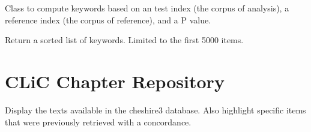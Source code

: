 \documentclass[letterpaper,10pt,english]{sphinxmanual}
\begin{document}
\begin{fulllineitems}
\label{apidoc:keywords.Keywords}
Class to compute keywords based on an test index (the corpus of analysis),
a reference index (the corpus of reference), and a P value.

\begin{fulllineitems}
\label{apidoc:keywords.Keywords.list_keywords}
Return a sorted list of keywords. Limited to the first 5000 items.

\end{fulllineitems}


\end{fulllineitems}



\section{CLiC Chapter Repository}
\label{apidoc:clic-chapter-repository}\label{apidoc:module-chapter_repository}
Display the texts available in the cheshire3 database. Also highlight specific
items that were previously retrieved with a concordance.
\end{document}

